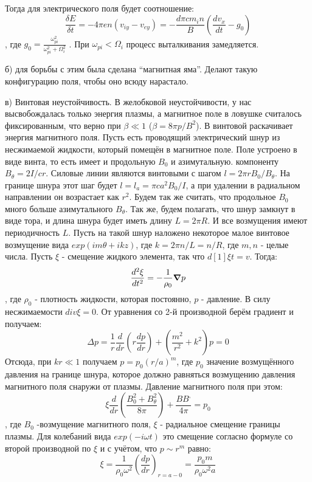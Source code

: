 \documentclass[10pt, a4paper]{article}
\begin{document}
Тогда для электрического поля будет соотношение:
\begin{equation}
	\frac{\delta E}{\delta t} = -4 \pi e n (v_{iy}-v_{ey})=- \frac{d \pi c m_i n}{B} (\frac{d v_x}{dt} - g_0)
\end{equation}
, где $g_0=\frac{\omega^2_{pi}}{\omega^2_{pi}+\Omega^2_i}$ . При $\omega_{pi} <\Omega_{i}$ процесс выталкивания замедляется.

б) для борьбы с этим была сделана “магнитная яма”. Делают такую конфигурацию поля, чтобы оно всюду нарастало.

в) Винтовая неустойчивость. В желобковой неустойчивости, у нас высвобождалась только энергия плазмы, а магнитное поле в ловушке считалось фиксированным, что верно при $\beta \ll 1$ ($\beta=8 \pi p / B^2$). В винтовой раскачивает энергия магнитного поля.
Пусть есть проводящий электрический шнур из несжимаемой жидкости, который помещён в магнитное поле. Поле устроено в виде винта, то есть имеет и продольную $B_0$ и азимутальную. компоненту $B_{\theta} = 2I/cr$. Силовые линии являются винтовыми с шагом $l=2 \pi r B_0 / B_{\theta}$. На границе шнура этот шаг будет $l=l_a=\pi c a^2 B_0 /I$, а при удалении в радиальном направлении он возрастает как $r^2$.
Будем так же считать, что продольное $B_0$ много больше азимутального $B_{\theta}$. Так же, будем полагать, что шнур замкнут в виде тора, и длина шнура будет иметь длину $L=2\pi R$. И все возмущения имеют периодичность $L$. Пусть на такой шнур наложено некоторое малое винтовое возмущение вида $exp(im \theta + ikz)$, где $k=2 \pi n/L=n/R$, где $m,n$ - целые числа. Пусть $\xi$ - смещение жидкого элемента, так что $d[1]{\xi}{t}=v$. Тогда:
\begin{equation}
\frac{d^{2}\xi}{dt^{2}}= - \frac{1}{\rho_0} \grad p
\end{equation}
, где $\rho_0$ -  плотность жидкости, которая постоянно, $p$ - давление. В силу несжимаемости $div \xi =0$. От уравнения со 2-й производной берём градиент и получаем:
\begin{equation}
\Delta p = \frac{1}{r} \frac{d}{dr} (r \frac{dp}{dr})+(\frac{m^2}{r^2}+k^2)p=0
\end{equation}
Отсюда, при $kr \ll 1$ получаем $p=p_0 (r/a)^{m}$, где $p_0$ значение возмущённого давления на границе шнура, которое должно равняться возмущению давления магнитного поля снаружи от плазмы. Давление магнитного поля при этом:
\begin{equation}
\xi \frac{d}{dr}(\frac{B^2_0+B^2_{\theta}}{8 \pi}) + \frac{B B^{,}}{4 \pi}=p_0
\end{equation}
, где $B_0$ -возмущение магнитного поля, $\xi$ - радиальное смещение границы плазмы. Для колебаний вида $exp(-i \omega t)$ это смещение согласно формуле со второй производной по $\xi$ и с учётом, что $p \sim r^{m}$ равно:
\begin{equation}
\xi = \frac{1}{\rho_0 \omega^2} (\frac{dp}{dr})_{r=a-0}= \frac{p_0 m}{\rho_0 \omega^2 a}
\end{equation}
\end{document}
